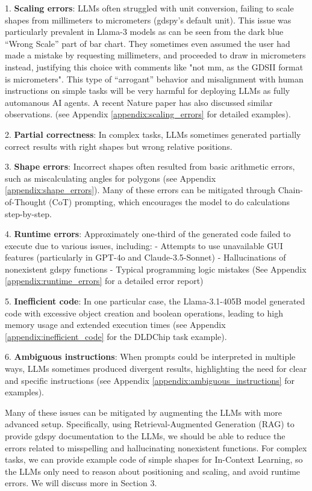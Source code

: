 \documentclass{article}
\begin{document}
1. \textbf{Scaling errors}: LLMs often struggled with unit conversion, failing to scale shapes from millimeters to micrometers (gdspy's default unit). This issue was particularly prevalent in Llama-3 models as can be seen from the dark blue ``Wrong Scale'' part of bar chart. They sometimes even assumed the user had made a mistake by requesting millimeters, and proceeded to 
draw in micrometers instead, justifying this choice 
with comments like "not mm, as the GDSII format is 
micrometers". This type of ``arrogant'' behavior and 
misalignment with human instructions on simple tasks 
will be very harmful for deploying LLMs as fully 
automanous AI agents. A recent Nature paper \cite
{ZhouNature2024} has also discussed similar 
observations. (see Appendix \ref{appendix:scaling_errors} for detailed examples).

2. \textbf{Partial correctness}: In complex tasks, LLMs sometimes generated partially correct results with right shapes but wrong relative positions.

3. \textbf{Shape errors}: Incorrect shapes often resulted from basic arithmetic errors, such as miscalculating angles for polygons (see Appendix \ref{appendix:shape_errors}). Many of these errors can be mitigated 
through Chain-of-Thought (CoT) prompting, which 
encourages the model to do calculations step-by-step.

4. \textbf{Runtime errors}: Approximately one-third of the generated code failed to execute due to various issues, including:
   - Attempts to use unavailable GUI features (particularly in GPT-4o and Claude-3.5-Sonnet)
   - Hallucinations of nonexistent gdspy functions
   - Typical programming logic mistakes
   (See Appendix \ref{appendix:runtime_errors} for a detailed error report)

5. \textbf{Inefficient code}: In one particular case, the Llama-3.1-405B model generated code with excessive object creation and boolean operations, leading to high memory usage and extended execution times (see Appendix \ref{appendix:inefficient_code} for the DLDChip task example).

6. \textbf{Ambiguous instructions}: When prompts could be interpreted in multiple ways, LLMs sometimes produced divergent results, highlighting the need for clear and specific instructions (see Appendix \ref{appendix:ambiguous_instructions} for examples).

Many of these issues can be mitigated by augmenting the LLMs with more advanced setup. Specifically, using Retrieval-Augmented Generation (RAG) to provide gdspy documentation to the LLMs, we should be able to reduce the errors related to misspelling and hallucinating nonexistent functions. For complex tasks, we can provide example code of simple shapes for In-Context Learning, so the LLMs only need to reason about positioning and scaling, and avoid runtime errors. We will discuss more in Section 3.
\end{document}
